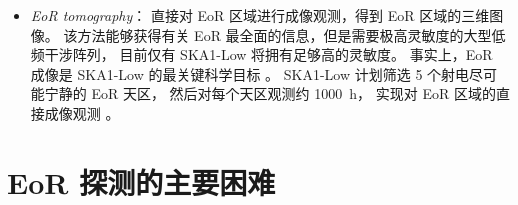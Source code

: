 \begin{itemize}
\item \emph{EoR \ac{tomography}}：
直接对 EoR 区域进行成像观测，得到 EoR 区域的三维图像。
该方法能够获得有关 EoR 最全面的信息，但是需要极高灵敏度的大型低频干涉阵列，
目前仅有 SKA1-Low 将拥有足够高的灵敏度。
事实上，EoR 成像是 SKA1-Low 的最关键科学目标 \cite{braun2014ska}。
SKA1-Low 计划筛选 5 个射电尽可能宁静的 EoR 天区，
然后对每个天区观测约 \SI{1000}{\hour}，
实现对 EoR 区域的直接成像观测 \cite{mellema2013,mellema2015,koopmans2015}。
\end{itemize}


\section{EoR 探测的主要困难}
\label{sec:det-difficulties}

